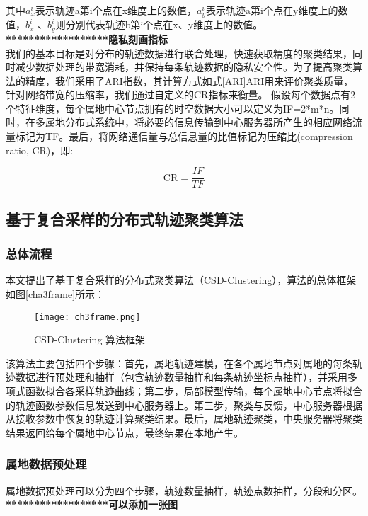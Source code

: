 其中$a_x^i$表示轨迹a第i个点在x维度上的数值，$a_y^i$表示轨迹a第i个点在y维度上的数值，$b_x^i$ 、$b_y^i$则分别代表轨迹b第i个点在x、y维度上的数值。	\\
\textbf{******************隐私刻画指标}\\
我们的基本目标是对分布的轨迹数据进行联合处理，快速获取精度的聚类结果，同时减少数据处理的带宽消耗，并保持每条轨迹数据的隐私安全性。为了提高聚类算法的精度，我们采用了ARI指数，其计算方式如式\ref{ARI}ARI用来评价聚类质量，针对网络带宽的压缩率，我们通过自定义的CR指标来衡量。
假设每个数据点有2个特征维度，每个属地中心节点拥有的时空数据大小可以定义为IF=2*m*n。同时，在多属地分布式系统中，将必要的信息传输到中心服务器所产生的相应网络流量标记为TF。最后，将网络通信量与总信息量的比值标记为压缩比(compression ratio, CR)，即:

\begin{equation}
\label{CR}
\mathrm{CR}=\frac{I F}{T F}
\end{equation}






\subsection{基于复合采样的分布式轨迹聚类算法}

\subsubsection{总体流程}
本文提出了基于复合采样的分布式聚类算法（CSD-Clustering），算法的总体框架如图\ref{cha3frame}所示：

\begin{figure}[h]
	\texttt{[image: ch3frame.png]}
	\caption{CSD-Clustering 算法框架}
	\label{ch3frame}
\end{figure}

该算法主要包括四个步骤：首先，属地轨迹建模，在各个属地节点对属地的每条轨迹数据进行预处理和抽样（包含轨迹数量抽样和每条轨迹坐标点抽样），并采用多项式函数拟合各采样轨迹曲线；第二步，局部模型传输，每个属地中心节点将拟合的轨迹函数参数信息发送到中心服务器上。第三步，聚类与反馈，中心服务器根据从接收参数中恢复的轨迹计算聚类结果。最后，属地轨迹聚类，中央服务器将聚类结果返回给每个属地中心节点，最终结果在本地产生。 



\subsubsection{属地数据预处理}
属地数据预处理可以分为四个步骤，轨迹数量抽样，轨迹点数抽样，分段和分区。
\textbf{******************可以添加一张图 }

